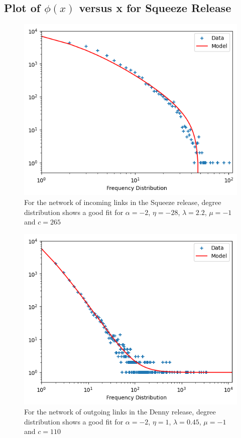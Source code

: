 \documentclass[aps,twocolumn,10pt,reprint]{revtex4}
\begin{document}
\subsection{Plot of $\phi(x)$ versus x for Squeeze Release }

    \begin{figure}[H]
        \centering
        \includegraphics[width=1.0\linewidth, center]{images/lab5_q2_5.png}
        \vspace{-2mm}
        \caption{For the network of incoming links in the Squeeze release, degree distribution shows a good fit for $\alpha=-2$, $\eta=-28$, $\lambda=2.2$, $\mu = -1$ and $c =265$ }
        \label{fig:q2}
    \end{figure}

    \begin{figure}[H]
        \centering
        \includegraphics[width=1.0\linewidth, center]{images/lab5_q2_6.png}
        \vspace{-2mm}
        \caption{For the network of outgoing links in the Denny release, degree distribution shows a good fit for $\alpha=-2$, $\eta=1$, $\lambda=0.45$, $\mu = -1$ and $c =110$ }
        \label{fig:q2}
    \end{figure}
\end{document}
